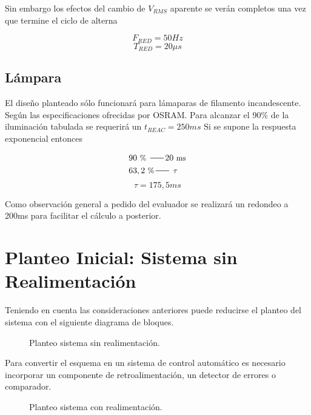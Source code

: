 \documentclass[a4paper,11pt]{article}
\begin{document}
Sin embargo los efectos del cambio de $V_{RMS}$ aparente se verán completos una vez que termine el ciclo de alterna

$$F_{RED}=50Hz$$
$$T_{RED}=20\mu s$$

\subsection{Lámpara}
El diseño planteado sólo funcionará para lámaparas de filamento incandescente.
Según las especificaciones ofrecidas por OSRAM.
Para alcanzar el 90\% de la iluminación tabulada se requerirá un $t_{REAC}=250ms$
Si se supone la respuesta exponencial entonces 

\begin{align*}
& 90~\text{\small \% } \,\rule[2.5pt]{16pt}{0.5pt}\,
20~\text{\small ms}\\
& 63,2~\text{\small \%} \,\rule[2.5pt]{16pt}{0.5pt}\,
~\text{\small $\tau$}
\end{align*}
$$\tau = 175,5ms$$

Como observación general a pedido del evaluador se realizará un redondeo a 200ms para facilitar el cálculo a posterior.

\section{Planteo Inicial: Sistema sin Realimentación}
Teniendo en cuenta las consideraciones anteriores puede reducirse el planteo del sistema con el siguiente diagrama de bloques.

\begin{figure}[H] %
	\caption{Planteo sistema sin realimentación.}
	\label{fig:sistema_sin_retro}
\end{figure} 
Para convertir el esquema en un sistema de control automático es necesario incorporar un componente de retroalimentación, un detector de errores o comparador.

\begin{figure}[H] %
	\caption{Planteo sistema con realimentación.}
	\label{fig:sistema_con_retro}
\end{figure} 
\end{document}
